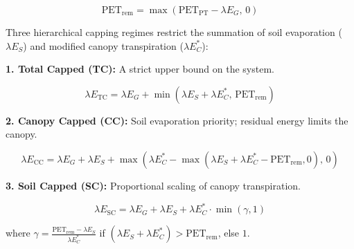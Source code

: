 \documentclass[11pt]{article}
\begin{document}
$$\mathrm{PET}_{\mathrm{rem}} = \max(\mathrm{PET}_{\mathrm{PT}} - \lambda E_G,\, 0)$$

Three hierarchical capping regimes restrict the summation of soil evaporation ($\lambda E_S$) and modified canopy transpiration ($\lambda E_C^\ast$):

\textbf{1. Total Capped (TC):} A strict upper bound on the system.


$$\lambda E_{\mathrm{TC}} = \lambda E_G + \min\left(\lambda E_S + \lambda E_C^\ast,\, \mathrm{PET}_{\mathrm{rem}}\right)$$

\textbf{2. Canopy Capped (CC):} Soil evaporation priority; residual energy limits the canopy.


$$\lambda E_{\mathrm{CC}} = \lambda E_G + \lambda E_S + \max\left(\lambda E_C^\ast - \max(\lambda E_S + \lambda E_C^\ast - \mathrm{PET}_{\mathrm{rem}}, 0),\, 0\right)$$

\textbf{3. Soil Capped (SC):} Proportional scaling of canopy transpiration.


$$\lambda E_{\mathrm{SC}} = \lambda E_G + \lambda E_S + \lambda E_C^\ast \cdot \min\left( \gamma, 1 \right)$$


where $\gamma = \frac{\mathrm{PET}_{\mathrm{rem}} - \lambda E_S}{\lambda E_C^\ast}$ if $(\lambda E_S + \lambda E_C^\ast) > \mathrm{PET}_{\mathrm{rem}}$, else $1$.
\end{document}
